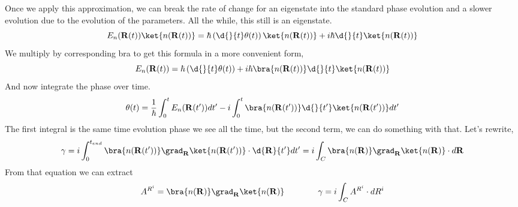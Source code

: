 Once we apply this approximation, we can break the rate of change for an eigenstate into the standard phase evolution and a slower evolution due to the evolution of the parameters.  All the while, this still is an eigenstate.
\begin{equation}
  E_n(\mathbf{R}(t)) \ket{n(\mathbf{R}(t))}
  =
  \hbar \left( \d{}{t} \theta(t) \right) \ket{n(\mathbf{R}(t))}
  +i \hbar \d{}{t}\ket{n(\mathbf{R}(t))}
\end{equation}
We multiply by corresponding bra to get this formula in a more convenient form,
\begin{equation}
  E_n(\mathbf{R}(t))=
  \hbar \left( \d{}{t}\theta(t) \right)
  + i \hbar \bra{n(\mathbf{R}(t))} \d{}{t} \ket{n(\mathbf{R}(t))}
\end{equation}
And now integrate the phase over time.
\begin{equation}
  \theta(t)=
  \frac{1}{\hbar}\int_{0}^{t}E_n(\mathbf{R}(t^{\prime}))dt^{\prime}
  -
  i \int_{0}^{t} \bra{n(\mathbf{R}(t^{\prime}))} \d{}{t^{\prime}} \ket{n(\mathbf{R}(t^{\prime}))} dt^{\prime}
\end{equation}
The first integral is the same time evolution phase we see all the time, but the second term, we can do something with that. Let's rewrite,
\begin{equation}
  \gamma
  =i \int_{0}^{t_{end}} \bra{n(\mathbf{R}(t^{\prime}))} \grad_{\mathbf{R}} \ket{n(\mathbf{R}(t^{\prime}))} \cdot \d{\mathbf{R}}{t^{\prime}} dt^{\prime}
  =i \int_{C} \bra{n(\mathbf{R})} \grad_{\mathbf{R}} \ket{n(\mathbf{R})} \cdot d \mathbf{R}
\end{equation}
From that equation we can extract
\begin{equation}
  A^{R^i} = \bra{n(\mathbf{R})} \grad_{\mathbf{R}} \ket{n(\mathbf{R})}
  \qquad \qquad \gamma= i \int_C A^{R^i} \cdot dR^i
\end{equation}
